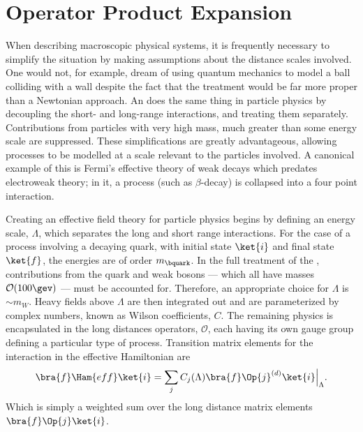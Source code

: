 \section{Operator Product Expansion}

When describing macroscopic physical systems, it is frequently necessary to simplify the situation
by making assumptions about the distance scales involved.
One would not, for example, dream of using quantum mechanics to model a ball colliding with a wall
despite the fact that the treatment would be far more proper than a Newtonian approach.
An \EFT does the same thing in particle physics
by decoupling the short- and long-range interactions, and treating them separately.
Contributions from particles with very high mass, much greater than some energy scale are
suppressed.
These simplifications are greatly advantageous, allowing processes to be modelled at a scale
relevant to the particles involved.
A canonical example of this is Fermi's effective theory of weak decays which predates electroweak
theory; in it, a process (such as $\beta$-decay) is collapsed into a four point interaction.

Creating an effective field theory for particle physics begins by defining an energy scale,
$\Lambda$, which separates the long and short range interactions.
For the case of a process involving a decaying \bquark quark, with initial state $\ket{i}$ and
final state $\ket{f}$,
the energies are of order $m_\bquark$.
In the full treatment of the \sm, contributions from the \tquark quark and weak bosons --- which all
have masses $\mathcal{O}(100\gev)$ --- must be accounted for.
Therefore, an appropriate choice for $\Lambda$ is $\sim m_W$.
Heavy fields above $\Lambda$ are then integrated out and are parameterized by complex numbers,
known as Wilson coefficients, $C$.
The remaining physics is encapsulated in the long distances operators, $\mathcal{O}$, each having
its own gauge group defining a particular type of process.
Transition matrix elements for the interaction in the effective Hamiltonian are
\begin{equation}
  \bra{f}\Ham{eff}\ket{i} =
  \sum_j C_j(\Lambda)\bra{f}\Op{j}^{(d)}\ket{i}\Big|_{\Lambda}.
  \label{eq:th:opeham}
\end{equation}
Which is simply a weighted sum over the long distance matrix elements $\bra{f}\Op{j}\ket{i}$.

